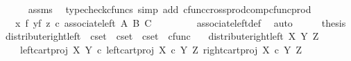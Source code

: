 \begin{isabellebody}
\ \ \ \ \isamarkupfalse%
\ assms\ \isamarkupfalse%
\ {\isacharparenleft}{\kern0pt}typecheck{\isacharunderscore}{\kern0pt}cfuncs{\isacharcomma}{\kern0pt}\ simp\ add{\isacharcolon}{\kern0pt}\ cfunc{\isacharunderscore}{\kern0pt}cross{\isacharunderscore}{\kern0pt}prod{\isacharunderscore}{\kern0pt}comp{\isacharunderscore}{\kern0pt}cfunc{\isacharunderscore}{\kern0pt}prod{\isacharparenright}{\kern0pt}\isanewline
\ \ \isamarkupfalse%
\ \isamarkupfalse%
\ {\isachardoublequoteopen}{\isachardot}{\kern0pt}{\isachardot}{\kern0pt}{\isachardot}{\kern0pt}\ {\isacharequal}{\kern0pt}\ {\isacharparenleft}{\kern0pt}{\isacharparenleft}{\kern0pt}x\ {\isasymtimes}\isactrlsub f\ y{\isacharparenright}{\kern0pt}{\isasymtimes}\isactrlsub f\ z{\isacharparenright}{\kern0pt}\ {\isasymcirc}\isactrlsub c\ associate{\isacharunderscore}{\kern0pt}left\ A\ B\ C{\isachardoublequoteclose}\ \ \ \isanewline
\ \ \ \ \isamarkupfalse%
\ associate{\isacharunderscore}{\kern0pt}left{\isacharunderscore}{\kern0pt}def\ \isamarkupfalse%
\ auto\isanewline
\ \ \isamarkupfalse%
\ \isamarkupfalse%
\ {\isacharquery}{\kern0pt}thesis\isacommand{{\isachardot}{\kern0pt}}\isamarkupfalse%
\isanewline
{}\isamarkupfalse%
%
\endisatagproof
{\isafoldproof}%
%
\isadelimproof
%
\endisadelimproof
%
\isadelimdocument
%
\endisadelimdocument
%
\isatagdocument
%
\isamarkuptrue%
%
\endisatagdocument
{\isafolddocument}%
%
\isadelimdocument
%
\endisadelimdocument
{}\isamarkupfalse%
\ distribute{\isacharunderscore}{\kern0pt}right{\isacharunderscore}{\kern0pt}left\ {\isacharcolon}{\kern0pt}{\isacharcolon}{\kern0pt}\ {\isachardoublequoteopen}cset\ {\isasymRightarrow}\ cset\ {\isasymRightarrow}\ cset\ {\isasymRightarrow}\ cfunc{\isachardoublequoteclose}\ \isanewline
\ \ {\isachardoublequoteopen}distribute{\isacharunderscore}{\kern0pt}right{\isacharunderscore}{\kern0pt}left\ X\ Y\ Z\ {\isacharequal}{\kern0pt}\ \isanewline
\ \ \ \ {\isasymlangle}left{\isacharunderscore}{\kern0pt}cart{\isacharunderscore}{\kern0pt}proj\ X\ Y\ {\isasymcirc}\isactrlsub c\ left{\isacharunderscore}{\kern0pt}cart{\isacharunderscore}{\kern0pt}proj\ {\isacharparenleft}{\kern0pt}X\ {\isasymtimes}\isactrlsub c\ Y{\isacharparenright}{\kern0pt}\ Z{\isacharcomma}{\kern0pt}\ right{\isacharunderscore}{\kern0pt}cart{\isacharunderscore}{\kern0pt}proj\ {\isacharparenleft}{\kern0pt}X\ {\isasymtimes}\isactrlsub c\ Y{\isacharparenright}{\kern0pt}\ Z{\isasymrangle}{\isachardoublequoteclose}\isanewline

\end{isabellebody}
